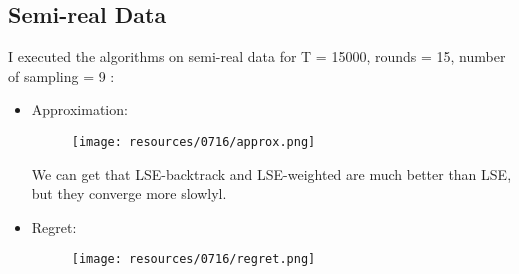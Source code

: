 \subsection*{Semi-real Data}
I executed the algorithms on semi-real data for T = 15000, rounds = 15, number of sampling = 9 :

\begin{itemize}
	\item Approximation:
	\begin{figure}[h]
		\centering
		\texttt{[image: resources/0716/approx.png]}
		\label{interval2}
	\end{figure}
	
	We can get that LSE-backtrack and LSE-weighted are much better than LSE, but they converge more slowlyl.

	\item Regret:
	\begin{figure}[h]
		\centering
		\texttt{[image: resources/0716/regret.png]}
		\label{interval2}
	\end{figure}	
	
\end{itemize}
	